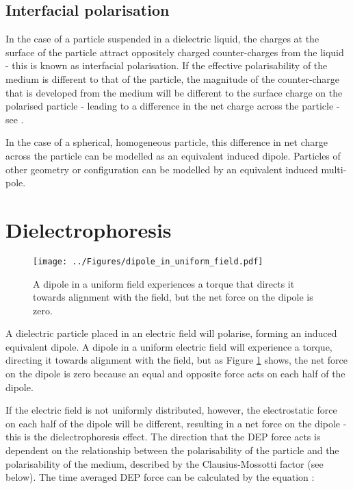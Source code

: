 \subsection{Interfacial polarisation}

In the case of a particle suspended in a dielectric liquid, the charges at the surface of the particle attract oppositely charged counter-charges from the liquid - this is known as interfacial polarisation. If the effective polarisability of the medium is different to that of the particle, the magnitude of the counter-charge that is developed from the medium will be different to the surface charge on the polarised particle - leading to a difference in the net charge across the particle - see .

In the case of a spherical, homogeneous particle, this difference in net charge across the particle can be modelled as an equivalent induced dipole. Particles of other geometry or configuration can be modelled by an equivalent induced multi-pole. 

\section{Dielectrophoresis}
\label{sec:bg_dielectrophoresis}

\begin{figure}[t]
 \centering
 \texttt{[image: ../Figures/dipole\_in\_uniform\_field.pdf]}
 \caption[A dipole in a uniform field experiences a torque that directs it towards alignment with the field.]{A dipole in a uniform field experiences a torque that directs it towards alignment with the field, but the net force on the dipole is zero.}
 \label{fig:dipole_in_uniform_field}
\end{figure}

A dielectric particle placed in an electric field will polarise, forming an induced equivalent dipole. A dipole in a uniform electric field will experience a torque, directing it towards alignment with the field, but as Figure \ref{fig:dipole_in_uniform_field} shows, the net force on the dipole is zero because an equal and opposite force acts on each half of the dipole.

If the electric field is not uniformly distributed, however, the electrostatic force on each half of the dipole will be different, resulting in a net force on the dipole - this is the dielectrophoresis effect. The direction that the DEP force acts is dependent on the relationship between the polarisability of the particle and the polarisability of the medium, described by the Clausius-Mossotti factor (see below). The time averaged DEP force can be calculated by the equation \citep{Morgan:2003}:

